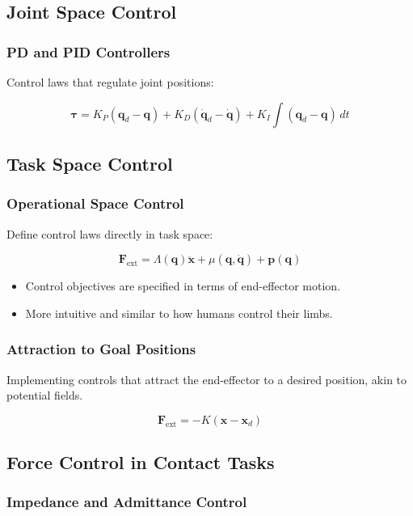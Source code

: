 \documentclass{article}
\begin{document}
\subsection{Joint Space Control}

\subsubsection{PD and PID Controllers}

Control laws that regulate joint positions:

$$
\bm{\tau} = K_P (\mathbf{q}_d - \mathbf{q}) + K_D (\dot{\mathbf{q}}_d - \dot{\mathbf{q}}) + K_I \int (\mathbf{q}_d - \mathbf{q}) \, dt
$$

\subsection{Task Space Control}

\subsubsection{Operational Space Control}

Define control laws directly in task space:

$$
\mathbf{F}_{\text{ext}} = \Lambda(\mathbf{q}) \ddot{\mathbf{x}} + \mu(\mathbf{q}, \dot{\mathbf{q}}) + \mathbf{p}(\mathbf{q})
$$

\begin{itemize}
    \item Control objectives are specified in terms of end-effector motion.
    \item More intuitive and similar to how humans control their limbs.
\end{itemize}

\subsubsection{Attraction to Goal Positions}

Implementing controls that attract the end-effector to a desired position, akin to potential fields.

$$
\mathbf{F}_{\text{ext}} = -K (\mathbf{x} - \mathbf{x}_d)
$$

\subsection{Force Control in Contact Tasks}

\subsubsection{Impedance and Admittance Control}
\end{document}
